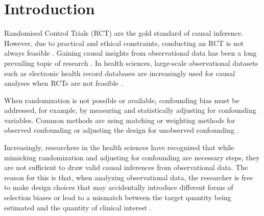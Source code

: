 \documentclass[pdflatex,sn-vancouver-ay]{sn-jnl}%
\theoremstyle{thmstyleone}%
\theoremstyle{thmstyletwo}%
\theoremstyle{thmstylethree}%
\begin{document}



\maketitle

\section{Introduction}\label{Intro}
Randomised Control Trials (RCT) are the gold standard of causal inference. However, due to practical and ethical constraints, conducting an RCT is not always feasible \citep{hernanUsingBigData2016, sanson-fisherLimitationsRandomizedControlled2007}. Gaining causal insights from observational data has been a long prevailing topic of research \citep{woldCausalInferenceObservational1956, nicholsCausalInferenceObservational}. In health sciences, large-scale observational datasets such as electronic health record databases are increasingly used for causal analyses when RCTs are not feasible \citep{bakkerAnalysingElectronicHealth2021}. 

When randomization is not possible or available, confounding bias must be addressed, for example, by measuring and statistically adjusting for confounding variables. Common methods are using matching or weighting methods for observed confounding \citep{schaferAverageCausalEffects2008} or adjusting the design for unobserved confounding \citep{igelstromCausalInferenceEffect2022, listlCausalInferenceObservational2016}.

Increasingly, researchers in the health sciences have recognized that while mimicking randomization and adjusting for confounding are necessary steps, they are not sufficient to draw valid causal inferences from observational data. The reason for this is that, when analyzing observational data, the researcher is free to make design choices that may accidentally introduce different forms of selection biases or lead to a mismatch between the target quantity being estimated and the quantity of clinical interest \citep{fuTargetTrialEmulation2023}. 
\end{document}
